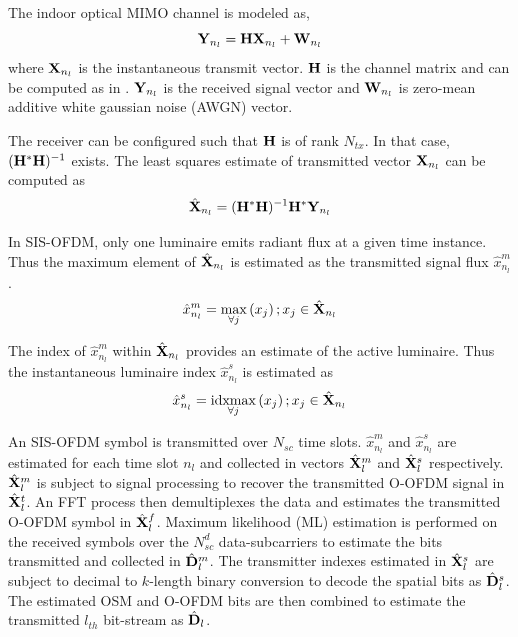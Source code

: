 \documentclass[12pt,letterpaper,onecolumn]{article} %
\newcommand{\vm}[1]{{\bf{#1}}}
\newcommand{\idxmax}{\operatornamewithlimits{idxmax}}
\begin{document}
The indoor optical MIMO channel is modeled as,
\begin{equation}
	\label{eqChannel}
	\vm{Y}_{n_l} = \vm{H}\vm{X}_{n_l} + \vm{W}_{n_l}
\end{equation}
where $\vm{X}_{n_l}$ is the instantaneous transmit vector. $\vm{H}$ is the channel matrix and can be computed as in \cite{but13a}. $\vm{Y}_{n_l}$ is the received signal vector and $\vm{W}_{n_l}$ is zero-mean additive white gaussian noise (AWGN) vector.

The receiver can be configured such that $\vm{H}$ is of rank $N_{tx}$. In that case, $(\vm{H}^{*}\vm{H})^{-1}$ exists. The least squares estimate of transmitted vector $\vm{X}_{n_l}$ can be computed as
\begin{equation}
	\label{eqXls}
	\hat{\vm{X}}_{n_l} = (\vm{H}^{*}\vm{H})^{-1}\vm{H}^{*}\vm{Y}_{n_l}
\end{equation}

In SIS-OFDM, only one luminaire emits radiant flux at a given time instance. Thus the maximum element of $\hat{\vm{X}}_{n_l}$ is estimated as the transmitted signal flux $\hat{x}^{m}_{n_l}$.
\begin{equation}
	\label{eqxhsym}
	\hat{x}^{m}_{n_l} = \max_{\forall j}\left(x_{j}\right); x_{j}\in\hat{\vm{X}}_{n_l}
\end{equation}

The index of $\hat{x}^{m}_{n_l}$ within $\hat{\vm{X}}_{n_l}$ provides an estimate of the active luminaire. Thus the instantaneous luminaire index $\hat{x}^{s}_{n_l}$ is estimated as
\begin{equation}
	\label{eqxhtx}
	\hat{x}^{s}_{n_l} = \idxmax_{\forall j}\left(x_{j}\right); x_{j}\in\hat{\vm{X}}_{n_l}
\end{equation}

An SIS-OFDM symbol is transmitted over $N_{sc}$ time slots. $\hat{x}^{m}_{n_l}$ and $\hat{x}^{s}_{n_l}$ are estimated for each time slot $n_l$ and collected in vectors $\hat{\vm{X}}^m_l$ and $\hat{\vm{X}}^s_l$ respectively. $\hat{\vm{X}}^m_l$ is subject to signal processing to recover the transmitted O-OFDM signal in $\hat{\vm{X}}^t_l$. An FFT process then demultiplexes the data and estimates the transmitted O-OFDM symbol in $\hat{\vm{X}}^f_l$. Maximum likelihood (ML) estimation is performed on the received symbols over the $N_{sc}^d$ data-subcarriers to estimate the bits transmitted and collected in $\hat{\vm{D}}^m_l$. The transmitter indexes estimated in $\hat{\vm{X}}^s_l$ are subject to decimal to $k$-length binary conversion to decode the spatial bits as $\hat{\vm{D}}^s_l$. The estimated OSM and O-OFDM bits are then combined to estimate the transmitted $l_{th}$ bit-stream as $\hat{\vm{D}}_l$.
\end{document}
